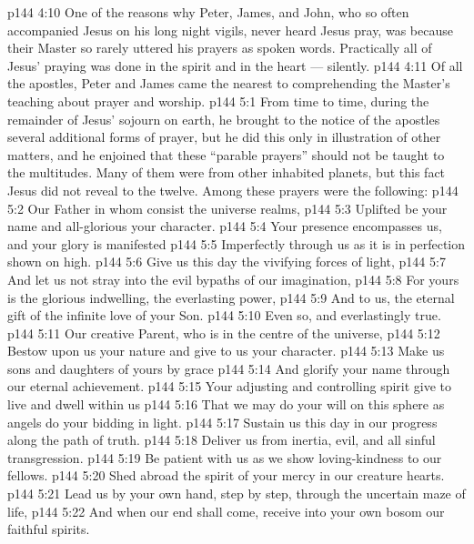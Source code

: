 \vs p144 4:10 \pc One of the reasons why Peter, James, and John, who so often accompanied Jesus on his long night vigils, never heard Jesus pray, was because their Master so rarely uttered his prayers as spoken words. Practically all of Jesus’ praying was done in the spirit and in the heart --- silently.
\vs p144 4:11 Of all the apostles, Peter and James came the nearest to comprehending the Master’s teaching about prayer and worship.
\vs p144 5:1 From time to time, during the remainder of Jesus’ sojourn on earth, he brought to the notice of the apostles several additional forms of prayer, but he did this only in illustration of other matters, and he enjoined that these “parable prayers” should not be taught to the multitudes. Many of them were from other inhabited planets, but this fact Jesus did not reveal to the twelve. Among these prayers were the following:
\vspace*{1ex}
\vs p144 5:2 Our Father in whom consist the universe realms,
\vs p144 5:3 \hsetoff Uplifted be your name and all\hyp{}glorious your character.
\vs p144 5:4 Your presence encompasses us, and your glory is manifested
\vs p144 5:5 \hsetoff Imperfectly through us as it is in perfection shown on high.
\vs p144 5:6 Give us this day the vivifying forces of light,
\vs p144 5:7 \hsetoff And let us not stray into the evil bypaths of our imagination,
\vs p144 5:8 For yours is the glorious indwelling, the everlasting power,
\vs p144 5:9 \hsetoff And to us, the eternal gift of the infinite love of your Son.
\vs p144 5:10 Even so, and everlastingly true.
\separatorshort
\vs p144 5:11 Our creative Parent, who is in the centre of the universe,
\vs p144 5:12 \hsetoff Bestow upon us your nature and give to us your character.
\vs p144 5:13 Make us sons and daughters of yours by grace
\vs p144 5:14 \hsetoff And glorify your name through our eternal achievement.
\vs p144 5:15 Your adjusting and controlling spirit give to live and dwell within us
\vs p144 5:16 \hsetoff That we may do your will on this sphere as angels do your bidding in light.
\vs p144 5:17 Sustain us this day in our progress along the path of truth.
\vs p144 5:18 \hsetoff Deliver us from inertia, evil, and all sinful transgression.
\vs p144 5:19 Be patient with us as we show loving\hyp{}kindness to our fellows.
\vs p144 5:20 \hsetoff Shed abroad the spirit of your mercy in our creature hearts.
\vs p144 5:21 Lead us by your own hand, step by step, through the uncertain maze of life,
\vs p144 5:22 \hsetoff And when our end shall come, receive into your own bosom our faithful spirits.
